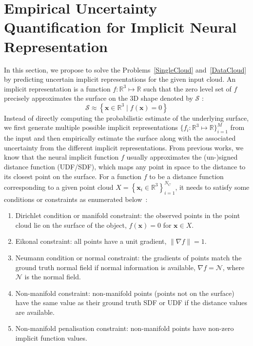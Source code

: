 \section{Empirical Uncertainty Quantification for Implicit Neural Representation}
In this section, we propose to solve the Problems~\ref{SingleCloud} and~\ref{DataCloud} by predicting uncertain implicit representations for the given input cloud. An implicit representation is a function $f: \mathbb{R}^{3} \mapsto \mathbb{R}$ such that the zero level set of $f$ precisely approximates the surface on the 3D shape denoted by $\mathcal{S}$ :
\begin{equation}
\mathcal{S} \approx \left\{\mathbf{x} \in \mathbb{R}^{3} \mid f(\mathbf{x})=0\right\}
\end{equation} 
Instead of directly computing the probabilistic estimate of the underlying surface, we first generate multiple possible implicit representations $\{f_i: \mathbb{R}^3 \mapsto \mathbb{R}\}_{i=1}^M$ from the input and then empirically estimate the surface along with the associated uncertainty from the different implicit representations. From previous works, we know that the neural implicit function $f$ usually approximates the (un-)signed distance function (UDF/SDF), which maps any point in space to the distance to its closest point on the surface. For a function $f$ to be a distance function corresponding to a given point cloud $X=\left\{\mathbf{x}_{i} \in \mathbb{R}^{3}\right\}_{i=1}^{N_C}$, it needs to satisfy some conditions or constraints as enumerated below~\cite{DiGS, NeuralHessian}:
\begin{enumerate}
    \item Dirichlet condition or manifold constraint: the observed points in the point cloud lie on the surface of the object, $f(\mathbf{x})=0$ for $\mathbf{x} \in X$.
    \item Eikonal constraint: all points have a unit gradient, $\|\nabla f\|=1$.
    \item Neumann condition or normal constraint:  the gradients of points match the ground truth normal field if normal information is available, $\nabla f=\mathcal{N}$, where $\mathcal{N}$ is the normal field.
    \item Non-manifold constraint: non-manifold points (points not on the surface) have the same value as their ground truth SDF or UDF if the distance values are available.
    \item Non-manifold penalisation constraint: non-manifold points have non-zero implicit function values.
\end{enumerate}
